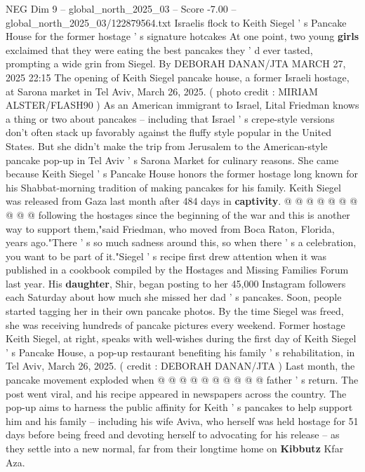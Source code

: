 \begin{textsample}{NEG Dim 9 – global\_north\_2025\_03 – Score -7.00 – global\_north\_2025\_03/122879564.txt}  \label{ex:f9_neg_146}
Israelis flock to Keith Siegel ' s Pancake House for the former hostage ' s signature hotcakes At one point, two young \textbf{girls} exclaimed that they were eating the best pancakes they ' d ever tasted, prompting a wide grin from Siegel.
By DEBORAH DANAN/JTA MARCH 27, 2025 22:15 The opening of Keith Siegel pancake house, a former Israeli hostage, at Sarona market in Tel Aviv, March 26, 2025. ( photo credit : MIRIAM ALSTER/FLASH90 ) As an American immigrant to Israel, Lital Friedman knows a thing or two about pancakes -- including that Israel ' s crepe-style versions don't often stack up favorably against the fluffy style popular in the United States.
But she didn't make the trip from Jerusalem to the American-style pancake pop-up in Tel Aviv ' s Sarona Market for culinary reasons.
She came because Keith Siegel ' s Pancake House honors the former hostage long known for his Shabbat-morning tradition of making pancakes for his family.
Keith Siegel was released from Gaza last month after 484 days in \textbf{captivity}. @ @ @ @ @ @ @ @ @ @ following the hostages since the beginning of the war and this is another way to support them,"said Friedman, who moved from Boca Raton, Florida, years ago."There ' s so much sadness around this, so when there ' s a celebration, you want to be part of it."Siegel ' s recipe first drew attention when it was published in a cookbook compiled by the Hostages and Missing Families Forum last year.
His \textbf{daughter}, Shir, began posting to her 45,000 Instagram followers each Saturday about how much she missed her dad ' s pancakes.
Soon, people started tagging her in their own pancake photos.
By the time Siegel was freed, she was receiving hundreds of pancake pictures every weekend.
Former hostage Keith Siegel, at right, speaks with well-wishes during the first day of Keith Siegel ' s Pancake House, a pop-up restaurant benefiting his family ' s rehabilitation, in Tel Aviv, March 26, 2025. ( credit : DEBORAH DANAN/JTA ) Last month, the pancake movement exploded when @ @ @ @ @ @ @ @ @ @ father ' s return.
The post went viral, and his recipe appeared in newspapers across the country.
The pop-up aims to harness the public affinity for Keith ' s pancakes to help support him and his family -- including his wife Aviva, who herself was held hostage for 51 days before being freed and devoting herself to advocating for his release -- as they settle into a new normal, far from their longtime home on \textbf{Kibbutz} Kfar Aza.

\end{textsample}
